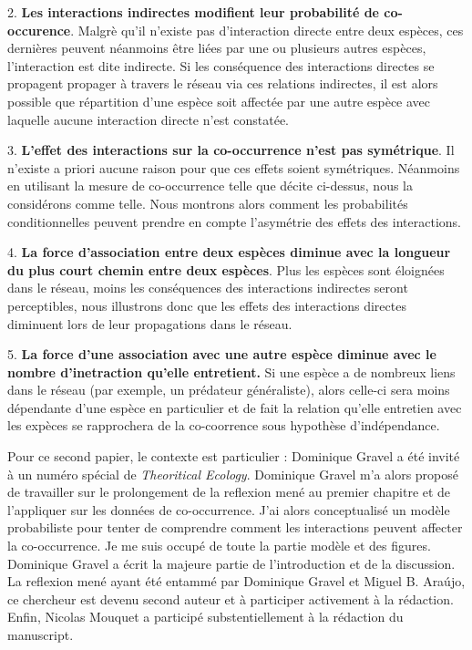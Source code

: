 2. \textbf{Les interactions indirectes modifient leur probabilité de co-occurence}. Malgrè qu'il n'existe pas d'interaction directe entre deux espèces, ces dernières peuvent néanmoins être liées par une ou plusieurs autres espèces, l'interaction est dite indirecte. Si les conséquence des interactions directes se propagent propager à travers le réseau via ces relations indirectes, il est alors possible que répartition d'une espèce soit affectée par une autre espèce avec laquelle aucune interaction directe n'est constatée.

3. \textbf{L'effet des interactions sur la co-occurrence n'est pas symétrique}. Il n'existe a priori aucune raison pour que ces effets soient symétriques. Néanmoins en utilisant la mesure de co-occurrence telle que décite ci-dessus, nous la considérons comme telle. Nous montrons alors comment les probabilités conditionnelles peuvent prendre en compte l'asymétrie des effets des interactions.

4. \textbf{La force d'association entre deux espèces diminue avec la longueur du plus court chemin entre deux espèces}. Plus les espèces sont éloignées dans le réseau, moins les conséquences des interactions indirectes seront perceptibles, nous illustrons donc que les effets des interactions directes diminuent lors de leur propagations dans le réseau.

5. \textbf{La force d'une association avec une autre espèce diminue avec le nombre d'inetraction qu'elle entretient.} Si une espèce a de nombreux liens dans le réseau (par exemple, un prédateur généraliste), alors celle-ci sera moins dépendante d'une espèce en particulier et de fait la relation qu'elle entretien avec les expèces se rapprochera de la co-coorrence sous hypothèse d'indépendance.


Pour ce second papier, le contexte est particulier : Dominique Gravel a été invité à un numéro spécial de \textit{Theoritical Ecology}. Dominique Gravel m'a alors proposé de travailler sur le prolongement de la reflexion mené au premier chapitre et de l'appliquer sur les données de co-occurrence. J'ai alors conceptualisé un modèle probabiliste pour tenter de comprendre comment les interactions peuvent affecter la co-occurrence. Je me suis occupé de toute la partie modèle et des figures. Dominique Gravel a écrit la majeure partie de l'introduction et de la discussion. La reflexion mené ayant été entammé par Dominique Gravel et  Miguel B. Ara\'ujo, ce chercheur est devenu second auteur et à participer activement à la rédaction. Enfin, Nicolas Mouquet a participé substentiellement à la rédaction du manuscript.



